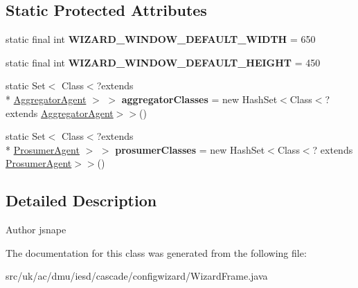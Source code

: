 \subsection*{Static Protected Attributes}
\begin{DoxyCompactItemize}
\item 
\hypertarget{classuk_1_1ac_1_1dmu_1_1iesd_1_1cascade_1_1configwizard_1_1_wizard_frame_ac0de7616ee1aa96c859d825e9e117900}{static final int {\bfseries W\-I\-Z\-A\-R\-D\-\_\-\-W\-I\-N\-D\-O\-W\-\_\-\-D\-E\-F\-A\-U\-L\-T\-\_\-\-W\-I\-D\-T\-H} = 650}\label{classuk_1_1ac_1_1dmu_1_1iesd_1_1cascade_1_1configwizard_1_1_wizard_frame_ac0de7616ee1aa96c859d825e9e117900}

\item 
\hypertarget{classuk_1_1ac_1_1dmu_1_1iesd_1_1cascade_1_1configwizard_1_1_wizard_frame_aac308430ce41af92d1bc4e049a909842}{static final int {\bfseries W\-I\-Z\-A\-R\-D\-\_\-\-W\-I\-N\-D\-O\-W\-\_\-\-D\-E\-F\-A\-U\-L\-T\-\_\-\-H\-E\-I\-G\-H\-T} = 450}\label{classuk_1_1ac_1_1dmu_1_1iesd_1_1cascade_1_1configwizard_1_1_wizard_frame_aac308430ce41af92d1bc4e049a909842}

\item 
\hypertarget{classuk_1_1ac_1_1dmu_1_1iesd_1_1cascade_1_1configwizard_1_1_wizard_frame_a2502899536619c945ee8e535ad7c8d98}{static Set$<$ Class$<$?extends \\*
\hyperlink{classuk_1_1ac_1_1dmu_1_1iesd_1_1cascade_1_1agents_1_1aggregators_1_1_aggregator_agent}{Aggregator\-Agent} $>$ $>$ {\bfseries aggregator\-Classes} = new Hash\-Set$<$Class$<$? extends \hyperlink{classuk_1_1ac_1_1dmu_1_1iesd_1_1cascade_1_1agents_1_1aggregators_1_1_aggregator_agent}{Aggregator\-Agent}$>$$>$()}\label{classuk_1_1ac_1_1dmu_1_1iesd_1_1cascade_1_1configwizard_1_1_wizard_frame_a2502899536619c945ee8e535ad7c8d98}

\item 
\hypertarget{classuk_1_1ac_1_1dmu_1_1iesd_1_1cascade_1_1configwizard_1_1_wizard_frame_a95735f55951796374aebf2ff94ea663b}{static Set$<$ Class$<$?extends \\*
\hyperlink{classuk_1_1ac_1_1dmu_1_1iesd_1_1cascade_1_1agents_1_1prosumers_1_1_prosumer_agent}{Prosumer\-Agent} $>$ $>$ {\bfseries prosumer\-Classes} = new Hash\-Set$<$Class$<$? extends \hyperlink{classuk_1_1ac_1_1dmu_1_1iesd_1_1cascade_1_1agents_1_1prosumers_1_1_prosumer_agent}{Prosumer\-Agent}$>$$>$()}\label{classuk_1_1ac_1_1dmu_1_1iesd_1_1cascade_1_1configwizard_1_1_wizard_frame_a95735f55951796374aebf2ff94ea663b}

\end{DoxyCompactItemize}


\subsection{Detailed Description}
\begin{DoxyAuthor}{Author}
jsnape 
\end{DoxyAuthor}


The documentation for this class was generated from the following file\-:\begin{DoxyCompactItemize}
\item 
src/uk/ac/dmu/iesd/cascade/configwizard/Wizard\-Frame.\-java\end{DoxyCompactItemize}
